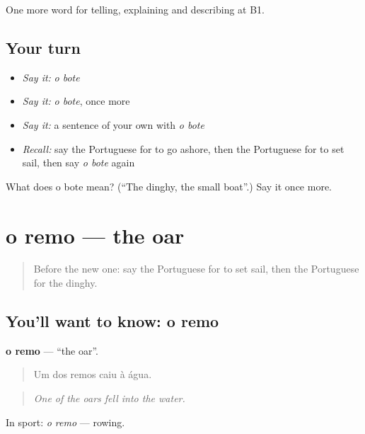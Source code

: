 \begin{grammarlens}[title={What you've built}]
One more word for telling, explaining and describing at B1.
\end{grammarlens}

\subsection*{Your turn}
\begin{itemize}
\raggedright
  \item \emph{Say it:} \emph{o bote}
  \item \emph{Say it:} \emph{o bote}, once more
  \item \emph{Say it:} a sentence of your own with \emph{o bote}
  \item \emph{Recall:} say the Portuguese for to go ashore, then the Portuguese for to set sail, then say \emph{o bote} again
\end{itemize}

\begin{tcolorbox}[breakable,colback=teal!4,colframe=teal!35!black,title={Before you move on}]
What does o bote mean? (\textquotedblleft{}The dinghy, the small boat\textquotedblright{}.) Say it once more.
\end{tcolorbox}
\section[o remo]{o remo — the oar}

\label{lesson:PT-C418-remo}



\begin{quote}
Before the new one: say the Portuguese for to set sail, then the Portuguese for the dinghy.
\end{quote}

\subsection*{You'll want to know: o remo}
\textbf{o remo} — \textquotedblleft{}the oar\textquotedblright{}.

\begin{quote}
Um dos remos caiu à água.
\end{quote}

\begin{quote}
\emph{One of the oars fell into the water.}
\end{quote}

In sport: \emph{o remo} — rowing.

